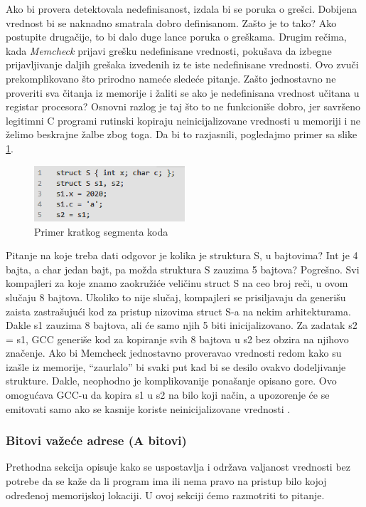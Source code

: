 \documentclass[12pt,oneside]{memoir}
\theoremstyle{plain}
\theoremstyle{definition}
\begin{document}
Ako bi provera detektovala nedefinisanost, izdala bi se poruka o grešci. Dobijena vrednost bi se naknadno smatrala dobro definisanom. Zašto je to tako? Ako postupite drugačije, to bi dalo duge lance poruka o greškama. Drugim rečima, kada \textit{Memcheck} prijavi grešku nedefinisane vrednosti, pokušava da izbegne prijavljivanje daljih grešaka izvedenih iz te iste nedefinisane vrednosti. Ovo zvuči prekomplikovano što prirodno nameće sledeće pitanje. Zašto jednostavno ne proveriti sva čitanja iz memorije i žaliti se ako je nedefinisana vrednost učitana u registar procesora? Osnovni razlog je taj što to ne funkcioniše dobro, jer savršeno legitimni C programi rutinski kopiraju neinicijalizovane vrednosti u memoriji i ne želimo beskrajne žalbe zbog toga. Da bi to razjasnili, pogledajmo primer sa slike \ref{fig:slika2.2}.
\begin{figure}[!ht]
  \centering
  \includegraphics[width=0.5\textwidth]{picture2.2.png}
  \caption{Primer kratkog segmenta koda}
  \label{fig:slika2.2}
\end{figure}

Pitanje na koje treba dati odgovor je kolika je struktura S, u bajtovima? Int je 4 bajta, a char jedan bajt, pa možda struktura S zauzima 5 bajtova? Pogrešno. Svi kompajleri za koje znamo zaokružiće veličinu struct S na ceo broj reči, u ovom slučaju 8 bajtova. Ukoliko to nije slučaj, kompajleri  se prisiljavaju da generišu zaista zastrašujući kod za pristup nizovima struct S-a na nekim arhitekturama. Dakle s1 zauzima 8 bajtova, ali će samo njih 5 biti inicijalizovano. Za zadatak s2 = s1, GCC generiše kod za kopiranje svih 8 bajtova u s2 bez obzira na njihovo značenje. Ako bi Memcheck jednostavno proveravao vrednosti redom kako su izašle iz memorije, “zaurlalo”  bi svaki put kad bi se desilo ovakvo dodeljivanje strukture. Dakle, neophodno je komplikovanije ponašanje opisano gore. Ovo omogućava GCC-u da kopira s1 u s2 na bilo koji način, a upozorenje će se emitovati samo ako se kasnije koriste neinicijalizovane vrednosti \cite{Memcheck}. 

\subsubsection{Bitovi važeće adrese (A bitovi)}
Prethodna sekcija opisuje kako se uspostavlja i održava valjanost vrednosti bez potrebe da se kaže da li program ima ili nema pravo na pristup bilo kojoj određenoj memorijskoj lokaciji. U ovoj sekciji ćemo razmotriti to pitanje.
\end{document}
